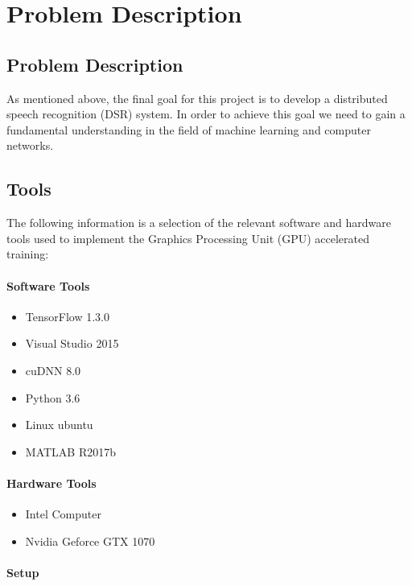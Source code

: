 \chapter{Problem Description}\label{ch:problem_description}
\section{Problem Description}

As mentioned above, the final goal for this project is to develop a distributed speech recognition (DSR) system.
In order to achieve this goal we need to gain a fundamental understanding in the field of machine learning and computer networks.\\

\section{Tools}
The following information is a selection of the relevant software and hardware tools used to implement the Graphics Processing Unit (GPU) accelerated training:

\subsubsection{Software Tools}
\begin{itemize}
	\item TensorFlow 1.3.0
	\item Visual Studio 2015
	\item cuDNN 8.0
	\item Python 3.6
	\item Linux ubuntu
	\item MATLAB  R2017b
\end{itemize}

\subsubsection{Hardware Tools}
\begin{itemize}
	\item Intel Computer
	\item Nvidia Geforce GTX 1070 \\
\end{itemize}

\subsubsection{Setup}

